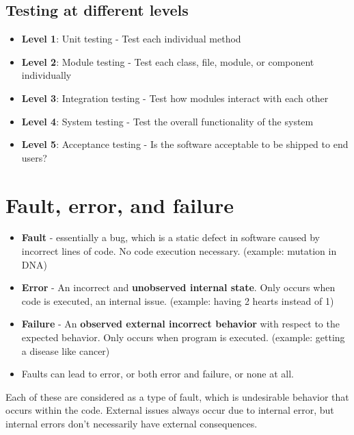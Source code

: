 \documentclass[12pt]{book}
\begin{document}
\subsection*{Testing at different levels}
\begin{itemize}
  \item \textbf{Level 1}: Unit testing - Test each individual method
  \item \textbf{Level 2}: Module testing - Test each class, file, module, or component individually
  \item \textbf{Level 3}: Integration testing - Test how modules interact with each other
  \item \textbf{Level 4}: System testing - Test the overall functionality of the system
  \item \textbf{Level 5}: Acceptance testing - Is the software acceptable to be shipped to end users?
\end{itemize}

\section*{Fault, error, and failure}
\begin{itemize}
  \item \textbf{Fault} - essentially a bug, which is a static defect in software caused by incorrect lines of code. No code execution necessary. (example: mutation in DNA)
  
  \item \textbf{Error} - An incorrect and \textbf{unobserved internal state}. Only occurs when code is executed, an internal issue. (example: having 2 hearts instead of 1)
  
  \item \textbf{Failure} - An \textbf{observed external incorrect behavior} with respect to the expected behavior. Only occurs when program is executed. (example: getting a disease like cancer)
  
  \item Faults can lead to error, or both error and failure, or none at all.
\end{itemize}

Each of these are considered as a type of fault, which is undesirable behavior that occurs within the code. External issues always occur due to internal error, but internal errors don't necessarily have external consequences.
\end{document}
